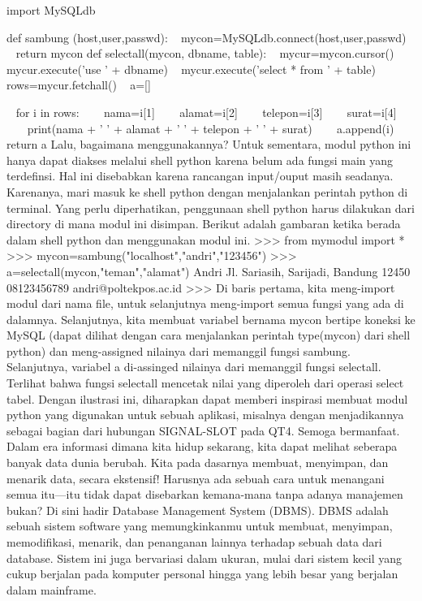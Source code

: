import MySQLdb \par
\noindent 
def sambung (host,user,passwd):
\noindent 
~ mycon=MySQLdb.connect(host,user,passwd) 
\noindent 
~ return mycon 
\vspace{12pt}
\noindent 
def selectall(mycon, dbname, table): 
\noindent 
~ mycur=mycon.cursor() 
\noindent 
~ mycur.execute('use ' + dbname) 
\noindent 
~ mycur.execute('select * from ' + table) 
\noindent 
~ rows=mycur.fetchall() 
\noindent 
~ a=[] \par
\noindent 
~ for i in rows: 
\noindent 
~~~ nama=i[1] 
\noindent 
~~~ alamat=i[2] 
\noindent 
~~~ telepon=i[3]
\noindent 
~~~ surat=i[4] 
\noindent 
~~~ print(nama + ' ' + alamat + ' ' + telepon + ' ' + surat)
\noindent 
~~~ a.append(i) 
\noindent 
~ return a 
Lalu, bagaimana menggunakannya? Untuk sementara, modul python ini hanya dapat diakses melalui shell python karena belum ada fungsi main yang terdefinsi. Hal ini disebabkan karena rancangan input/ouput masih seadanya. Karenanya, mari masuk ke shell python dengan menjalankan perintah python di terminal. Yang perlu diperhatikan, penggunaan shell python harus dilakukan dari directory di mana modul ini disimpan. Berikut adalah gambaran ketika berada dalam shell python dan menggunakan modul ini. 
\noindent 
>>> from mymodul import * 
\noindent 
>>> mycon=sambung("localhost","andri","123456") 
\noindent 
>>> a=selectall(mycon,"teman","alamat") 
\noindent 
Andri Jl. Sariasih, Sarijadi, Bandung 12450 08123456789 andri@poltekpos.ac.id 
\noindent 
>>>
Di baris pertama, kita meng-import modul dari nama file, untuk selanjutnya meng-import semua fungsi yang ada di dalamnya. Selanjutnya, kita membuat variabel bernama mycon bertipe koneksi ke MySQL (dapat dilihat dengan cara menjalankan perintah type(mycon) dari shell python) dan meng-assigned nilainya dari memanggil fungsi sambung. Selanjutnya, variabel a di-assinged nilainya dari memanggil fungsi selectall. Terlihat bahwa fungsi selectall mencetak nilai yang diperoleh dari operasi select tabel. 
\vspace{12pt}
Dengan ilustrasi ini, diharapkan dapat memberi inspirasi membuat modul python yang digunakan untuk sebuah aplikasi, misalnya dengan menjadikannya sebagai bagian dari hubungan SIGNAL-SLOT pada QT4. Semoga bermanfaat. 
\vspace{12pt}
Dalam era informasi dimana kita hidup sekarang, kita dapat melihat seberapa banyak data dunia berubah. Kita pada dasarnya membuat, menyimpan, dan menarik data, secara ekstensif! Harusnya ada sebuah cara untuk menangani semua itu—itu tidak dapat disebarkan kemana-mana tanpa adanya manajemen bukan? Di sini hadir Database Management System (DBMS). DBMS adalah sebuah sistem software yang memungkinkanmu untuk membuat, menyimpan, memodifikasi, menarik, dan penanganan lainnya terhadap sebuah data dari database. Sistem ini juga bervariasi dalam ukuran, mulai dari sistem kecil yang cukup berjalan pada komputer personal hingga yang lebih besar yang berjalan dalam mainframe. 
